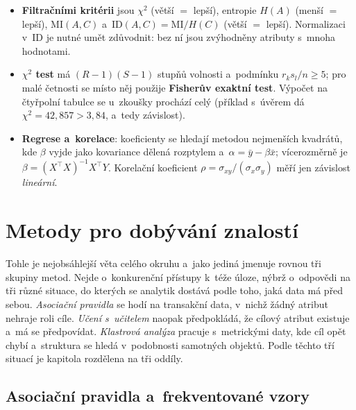 \documentclass[11pt,a4paper]{article}
\theoremstyle{definition}
\begin{document}
\begin{itemize}
      každý atribut samostatně a~je nezávislý na modelu, takže je rychlý, ale nezachytí
      interakce; wrapper staví model nad podmnožinou atributů a~vyhodnocuje jej, takže je
      drahý, zato interakce zohledňuje. Prohledávat lze \emph{bottom-up} (přidáváním) nebo
      \emph{top-down} (odebíráním).
\item \textbf{Filtračními kritérii} jsou $\chi^2$ (větší $=$ lepší), entropie $H(A)$ (menší
      $=$ lepší), $\mathrm{MI}(A,C)$ a~$\mathrm{ID}(A,C)=\mathrm{MI}/H(C)$ (větší $=$ lepší).
      Normalizaci v~$\mathrm{ID}$ je nutné umět zdůvodnit: bez ní jsou zvýhodněny atributy
      s~mnoha hodnotami.
\item \textbf{$\chi^2$ test} má $(R-1)(S-1)$ stupňů volnosti a~podmínku $r_ks_l/n\ge 5$; pro
      malé četnosti se místo něj použije \textbf{Fisherův exaktní test}. Výpočet na čtyřpolní
      tabulce se u~zkoušky prochází celý (příklad s~úvěrem dá $\chi^2=42{,}857>3{,}84$, a~tedy
      závislost).
\item \textbf{Regrese a~korelace}: koeficienty se hledají metodou nejmenších kvadrátů, kde
      $\beta$ vyjde jako kovariance dělená rozptylem a~$\alpha=\bar y-\beta\bar x$;
      vícerozměrně je $\beta=(X^{\!\top}\!X)^{-1}X^{\!\top}Y$. Korelační koeficient
      $\rho=\sigma_{xy}/(\sigma_x\sigma_y)$ měří jen závislost \emph{lineární}.
\end{itemize}

\newpage

\section{Metody pro dobývání znalostí}
\label{sec:metody}

Tohle je nejobsáhlejší věta celého okruhu a~jako jediná jmenuje rovnou tři skupiny metod.
Nejde o~konkurenční přístupy k~téže úloze, nýbrž o~odpovědi na tři různé situace, do kterých
se analytik dostává podle toho, jaká data má před sebou. \emph{Asociační pravidla} se hodí
na transakční data, v~nichž žádný atribut nehraje roli cíle. \emph{Učení s~učitelem}
naopak předpokládá, že cílový atribut existuje a~má se předpovídat. \emph{Klastrová analýza}
pracuje s~metrickými daty, kde cíl opět chybí a~struktura se hledá v~podobnosti samotných
objektů. Podle těchto tří situací je kapitola rozdělena na tři oddíly.

\subsection{Asociační pravidla a~frekventované vzory}
\label{ssec:ar}
\end{document}
